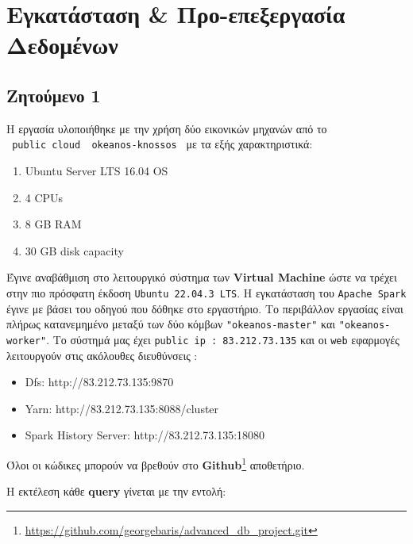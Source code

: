 \documentclass{article}
\begin{document}
\section{Εγκατάσταση \& Προ-επεξεργασία Δεδομένων}
\label{sec:introductory_z}
\subsection{Ζητούμενο 1}
\label{subsec:Z1}
Η εργασία υλοποιήθηκε με την χρήση δύο εικονικών μηχανών από το\\ \texttt{ public cloud ~okeanos-knossos }  με τα εξής χαρακτηριστικά:
\begin{enumerate}
    \item   Ubuntu Server LTS 16.04 OS
    \item   4 CPUs
    \item   8 GB RAM
    \item   30 GB disk capacity
\end{enumerate}
Έγινε αναβάθμιση στο λειτουργικό σύστημα των \textbf{Virtual Machine} ώστε να τρέχει στην πιο πρόσφατη έκδοση \texttt{Ubuntu 22.04.3 LTS}. Η εγκατάσταση του \texttt{Apache Spark} έγινε με βάσει του οδηγού που δόθηκε στο εργαστήριο. Το περιβάλλον εργασίας είναι πλήρως κατανεμημένο μεταξύ των δύο κόμβων \texttt{"okeanos-master"} και \texttt{"okeanos-worker"}. Το σύστημά μας έχει \texttt{public ip : 83.212.73.135} και οι \texttt{web} εφαρμογές λειτουργούν στις ακόλουθες διευθύνσεις :
\begin{itemize}
    \item   Dfs: http://83.212.73.135:9870
    \item   Yarn: http://83.212.73.135:8088/cluster 
    \item   Spark History Server: http://83.212.73.135:18080

\end{itemize}
Όλοι οι κώδικες μπορούν να βρεθούν στο \textbf{Github}\footnote{\href{https://github.com/georgebaris/advanced_db_project.git}{https://github.com/georgebaris/advanced\_db\_project.git}} αποθετήριο.



Η εκτέλεση κάθε \textbf{query} γίνεται με την εντολή:
\end{document}
